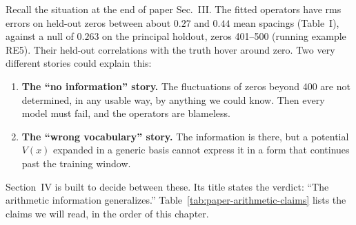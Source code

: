 Recall the situation at the end of paper Sec.~III. The fitted operators have rms errors on held-out zeros between about $0.27$ and $0.44$ mean spacings (Table~I), against a null of $0.263$ on the principal holdout, zeros 401--500 (running example RE5). Their held-out correlations with the truth hover around zero. Two very different stories could explain this:

\begin{enumerate}
\item \textbf{The ``no information'' story.} The fluctuations of zeros beyond 400 are not determined, in any usable way, by anything we could know. Then every model must fail, and the operators are blameless.
\item \textbf{The ``wrong vocabulary'' story.} The information is there, but a potential $V(x)$ expanded in a generic basis cannot express it in a form that continues past the training window.
\end{enumerate}

Section~IV is built to decide between these. Its title states the verdict: ``The arithmetic information generalizes.'' Table~\ref{tab:paper-arithmetic-claims} lists the claims we will read, in the order of this chapter.

